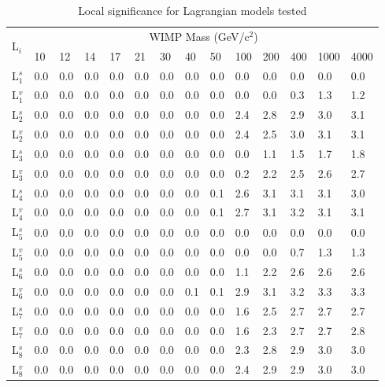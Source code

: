 \begin{table}[ht]
    \centering
    \caption{Local significance for Lagrangian models tested}
    \begin{tabular}{l|lllllllllllll}
    \hline
    \multirow{2}{*}{L$_i$} & \multicolumn{13}{c}{WIMP Mass (GeV/c$^2$)} \\
    & 10 & 12 & 14 & 17 & 21 & 30 & 40 & 50 & 100 & 200 & 400 & 1000 & 4000 \\
    
    \hline
    L$^s_1$ & 0.0 & 0.0 & 0.0 & 0.0 & 0.0 & 0.0 & 0.0 & 0.0 & 0.0 & 0.0 & 0.0 & 0.0 & 0.0 \\
    L$^v_1$ & 0.0 & 0.0 & 0.0 & 0.0 & 0.0 & 0.0 & 0.0 & 0.0 & 0.0 & 0.0 & 0.3 & 1.3 & 1.2 \\
    L$^s_2$ & 0.0 & 0.0 & 0.0 & 0.0 & 0.0 & 0.0 & 0.0 & 0.0 & 2.4 & 2.8 & 2.9 & 3.0 & 3.1 \\
    L$^v_2$ & 0.0 & 0.0 & 0.0 & 0.0 & 0.0 & 0.0 & 0.0 & 0.0 & 2.4 & 2.5 & 3.0 & 3.1 & 3.1 \\
    L$^s_3$ & 0.0 & 0.0 & 0.0 & 0.0 & 0.0 & 0.0 & 0.0 & 0.0 & 0.0 & 1.1 & 1.5 & 1.7 & 1.8 \\
    L$^v_3$ & 0.0 & 0.0 & 0.0 & 0.0 & 0.0 & 0.0 & 0.0 & 0.0 & 0.2 & 2.2 & 2.5 & 2.6 & 2.7 \\
    L$^s_4$ & 0.0 & 0.0 & 0.0 & 0.0 & 0.0 & 0.0 & 0.0 & 0.1 & 2.6 & 3.1 & 3.1 & 3.1 & 3.0 \\
    L$^v_4$ & 0.0 & 0.0 & 0.0 & 0.0 & 0.0 & 0.0 & 0.0 & 0.1 & 2.7 & 3.1 & 3.2 & 3.1 & 3.1 \\
    L$^s_5$ & 0.0 & 0.0 & 0.0 & 0.0 & 0.0 & 0.0 & 0.0 & 0.0 & 0.0 & 0.0 & 0.0 & 0.0 & 0.0 \\
    L$^v_5$ & 0.0 & 0.0 & 0.0 & 0.0 & 0.0 & 0.0 & 0.0 & 0.0 & 0.0 & 0.0 & 0.7 & 1.3 & 1.3 \\
    L$^s_6$ & 0.0 & 0.0 & 0.0 & 0.0 & 0.0 & 0.0 & 0.0 & 0.0 & 1.1 & 2.2 & 2.6 & 2.6 & 2.6 \\
    L$^v_6$ & 0.0 & 0.0 & 0.0 & 0.0 & 0.0 & 0.0 & 0.1 & 0.1 & 2.9 & 3.1 & 3.2 & 3.3 & 3.3 \\
    L$^s_7$ & 0.0 & 0.0 & 0.0 & 0.0 & 0.0 & 0.0 & 0.0 & 0.0 & 1.6 & 2.5 & 2.7 & 2.7 & 2.7 \\
    L$^v_7$ & 0.0 & 0.0 & 0.0 & 0.0 & 0.0 & 0.0 & 0.0 & 0.0 & 1.6 & 2.3 & 2.7 & 2.7 & 2.8 \\
    L$^s_8$ & 0.0 & 0.0 & 0.0 & 0.0 & 0.0 & 0.0 & 0.0 & 0.0 & 2.3 & 2.8 & 2.9 & 3.0 & 3.0 \\
    L$^v_8$ & 0.0 & 0.0 & 0.0 & 0.0 & 0.0 & 0.0 & 0.0 & 0.0 & 2.4 & 2.9 & 2.9 & 3.0 & 3.0 \\

\end{tabular}
\end{table}
